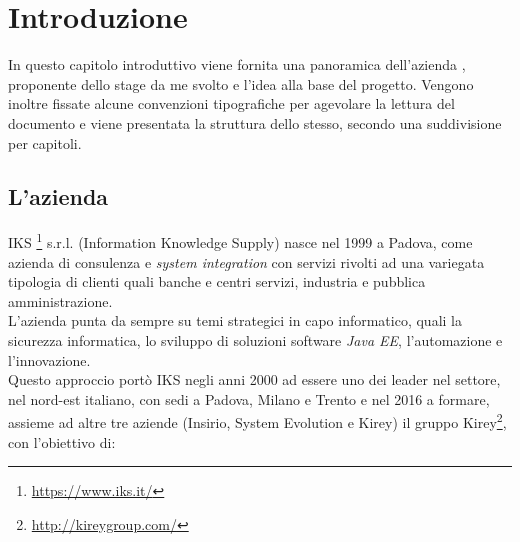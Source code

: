 
\pagestyle{IHA-fancy-style}
\chapter{Introduzione}
\label{cap:introduzione}

In questo capitolo introduttivo viene fornita una panoramica dell’azienda \myCompany, proponente dello stage da me svolto e l’idea alla base del progetto.
Vengono inoltre fissate alcune convenzioni tipografiche per agevolare la lettura del documento e viene presentata la struttura dello stesso, secondo una suddivisione per capitoli.




\section{L'azienda}
IKS \footnote{\url{https://www.iks.it/}} s.r.l. (Information Knowledge Supply) nasce nel 1999 a Padova, come azienda di consulenza e \textit{\gls{system integration}} con servizi rivolti ad una variegata tipologia di clienti quali banche e centri servizi, industria e pubblica amministrazione.\\

L'azienda punta da sempre su temi strategici in capo informatico, quali la sicurezza informatica, lo sviluppo di soluzioni software \textit{\gls{Java EE}}, l'automazione e l'innovazione. \\

Questo approccio portò IKS negli anni 2000 ad essere uno dei leader nel settore, nel nord-est italiano, con sedi a Padova, Milano e Trento e nel 2016 a formare, assieme ad altre tre aziende (Insirio, System Evolution e Kirey) il gruppo Kirey\footnote{\url{http://kireygroup.com/}}, con l'obiettivo di:

